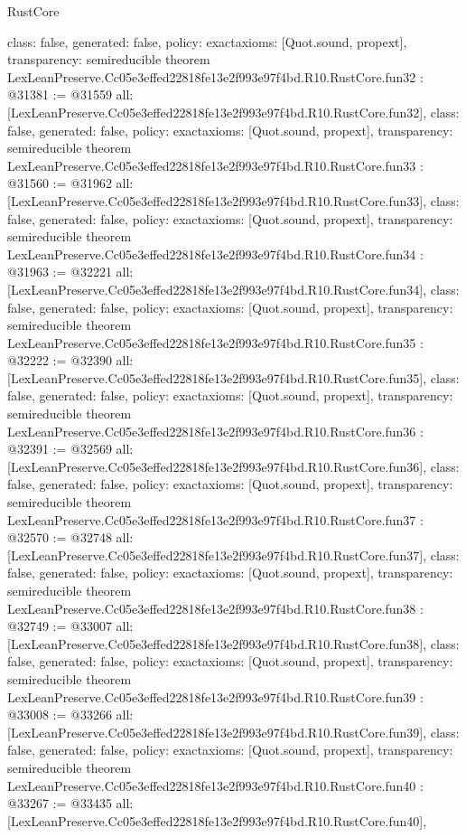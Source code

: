 \begin{lexlean}{RustCore}
\begin{coremodule}
{  class: false,
  generated: false,
  policy: exact{axioms: [Quot.sound, propext]},
  transparency: semireducible
}
theorem LexLeanPreserve.Cc05e3effed22818fe13e2f993e97f4bd.R10.RustCore.fun32 : @31381 := @31559 {
  all: [LexLeanPreserve.Cc05e3effed22818fe13e2f993e97f4bd.R10.RustCore.fun32],
  class: false,
  generated: false,
  policy: exact{axioms: [Quot.sound, propext]},
  transparency: semireducible
}
theorem LexLeanPreserve.Cc05e3effed22818fe13e2f993e97f4bd.R10.RustCore.fun33 : @31560 := @31962 {
  all: [LexLeanPreserve.Cc05e3effed22818fe13e2f993e97f4bd.R10.RustCore.fun33],
  class: false,
  generated: false,
  policy: exact{axioms: [Quot.sound, propext]},
  transparency: semireducible
}
theorem LexLeanPreserve.Cc05e3effed22818fe13e2f993e97f4bd.R10.RustCore.fun34 : @31963 := @32221 {
  all: [LexLeanPreserve.Cc05e3effed22818fe13e2f993e97f4bd.R10.RustCore.fun34],
  class: false,
  generated: false,
  policy: exact{axioms: [Quot.sound, propext]},
  transparency: semireducible
}
theorem LexLeanPreserve.Cc05e3effed22818fe13e2f993e97f4bd.R10.RustCore.fun35 : @32222 := @32390 {
  all: [LexLeanPreserve.Cc05e3effed22818fe13e2f993e97f4bd.R10.RustCore.fun35],
  class: false,
  generated: false,
  policy: exact{axioms: [Quot.sound, propext]},
  transparency: semireducible
}
theorem LexLeanPreserve.Cc05e3effed22818fe13e2f993e97f4bd.R10.RustCore.fun36 : @32391 := @32569 {
  all: [LexLeanPreserve.Cc05e3effed22818fe13e2f993e97f4bd.R10.RustCore.fun36],
  class: false,
  generated: false,
  policy: exact{axioms: [Quot.sound, propext]},
  transparency: semireducible
}
theorem LexLeanPreserve.Cc05e3effed22818fe13e2f993e97f4bd.R10.RustCore.fun37 : @32570 := @32748 {
  all: [LexLeanPreserve.Cc05e3effed22818fe13e2f993e97f4bd.R10.RustCore.fun37],
  class: false,
  generated: false,
  policy: exact{axioms: [Quot.sound, propext]},
  transparency: semireducible
}
theorem LexLeanPreserve.Cc05e3effed22818fe13e2f993e97f4bd.R10.RustCore.fun38 : @32749 := @33007 {
  all: [LexLeanPreserve.Cc05e3effed22818fe13e2f993e97f4bd.R10.RustCore.fun38],
  class: false,
  generated: false,
  policy: exact{axioms: [Quot.sound, propext]},
  transparency: semireducible
}
theorem LexLeanPreserve.Cc05e3effed22818fe13e2f993e97f4bd.R10.RustCore.fun39 : @33008 := @33266 {
  all: [LexLeanPreserve.Cc05e3effed22818fe13e2f993e97f4bd.R10.RustCore.fun39],
  class: false,
  generated: false,
  policy: exact{axioms: [Quot.sound, propext]},
  transparency: semireducible
}
theorem LexLeanPreserve.Cc05e3effed22818fe13e2f993e97f4bd.R10.RustCore.fun40 : @33267 := @33435 {
  all: [LexLeanPreserve.Cc05e3effed22818fe13e2f993e97f4bd.R10.RustCore.fun40],
}
\end{coremodule}
\end{lexlean}
